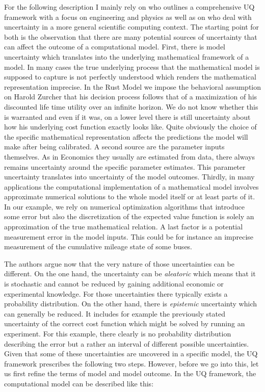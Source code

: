 For the following description I mainly rely on \cite{Smith.2013} who outlines a comprehensive UQ framework with a focus on engineering and physics as well as on \cite{Oberkampf.2010} who deal with uncertainty in a more general scientific computing context.  The starting point for both is the observation that there are many potential sources of uncertainty that can affect the outcome of a computational model. First, there is model uncertainty which translates into the underlying mathematical framework of a model. In many cases the true underlying process that the mathematical model is supposed to capture is not perfectly understood which renders the mathematical representation imprecise. In the Rust Model we impose the behavioral assumption on Harold Zurcher that his decision process follows that of a maximization of his discounted life time utility over an infinite horizon. We do not know whether this is warranted and even if it was, on a lower level there is still uncertainty about how his underlying cost function exactly looks like. Quite obviously the choice of the specific mathematical representation affects the predictions the model will make after being calibrated. A second source are the parameter inputs themselves. As in Economics they usually are estimated from data, there always remains uncertainty around the specific parameter estimates. This parameter uncertainty translates into uncertainty of the model outcomes. Thirdly, in many applications the computational implementation of a mathematical model involves approximate numerical solutions to the whole model itself or at least parts of it. In our example, we rely on numerical optimization algorithms that introduce some error but also the discretization of the expected value function is solely an approximation of the true mathematical relation. A last factor is a potential measurement error in the model inputs. This could be for instance an imprecise measurement of the cumulative mileage state of some buses.

The authors argue now that the very nature of those uncertainties can be different. On the one hand, the uncertainty can be \textit{aleatoric} which means that it is stochastic and cannot be reduced by gaining additional economic or experimental knowledge. For those uncertainties there typically exists a probability distribution. On the other hand, there is \textit{epistemic} uncertainty which can generally be reduced. It includes for example the previously stated uncertainty of the correct cost function which might be solved by running an experiment. For this example, there clearly is no probability distribution describing the error but a rather an interval of different possible uncertainties. Given that some of these uncertainties are uncovered in a specific model, the UQ framework prescribes the following two steps. However, before we go into this, let us first refine the terms of model and model outcome. In the UQ framework, the computational model can be described like this:

